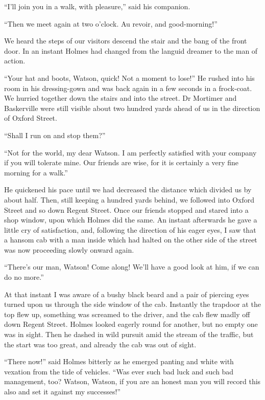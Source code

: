 \documentclass[paper=a5,BCOR=7mm,twoside,DIV=calc,12pt,usegeometry,openany,chapterprefix,endperiod,headings=big]{scrbook} %
\begin{document}
\enquote{I'll join you in a walk, with pleasure,} said his companion.

\enquote{Then we meet again at two o'clock. Au revoir, and good-morning!}

We heard the steps of our visitors descend the stair and the bang of the front door. In an instant Holmes had changed from the languid dreamer to the man of action.

\enquote{Your hat and boots, Watson, quick! Not a moment to lose!} He rushed into his room in his dressing-gown and was back again in a few seconds in a frock-coat. We hurried together down the stairs and into the street. Dr Mortimer and Baskerville were still visible about two hundred yards ahead of us in the direction of Oxford Street.

\enquote{Shall I run on and stop them?}

\enquote{Not for the world, my dear Watson. I am perfectly satisfied with your company if you will tolerate mine. Our friends are wise, for it is certainly a very fine morning for a walk.}

He quickened his pace until we had decreased the distance which divided us by about half. Then, still keeping a hundred yards behind, we followed into Oxford Street and so down Regent Street. Once our friends stopped and stared into a shop window, upon which Holmes did the same. An instant afterwards he gave a little cry of satisfaction, and, following the direction of his eager eyes, I saw that a hansom cab with a man inside which had halted on the other side of the street was now proceeding slowly onward again.

\enquote{There's our man, Watson! Come along! We'll have a good look at him, if we can do no more.}

At that instant I was aware of a bushy black beard and a pair of piercing eyes turned upon us through the side window of the cab. Instantly the trapdoor at the top flew up, something was screamed to the driver, and the cab flew madly off down Regent Street. Holmes looked eagerly round for another, but no empty one was in sight. Then he dashed in wild pursuit amid the stream of the traffic, but the start was too great, and already the cab was out of sight.

\enquote{There now!} said Holmes bitterly as he emerged panting and white with vexation from the tide of vehicles. \enquote{Was ever such bad luck and such bad management, too? Watson, Watson, if you are an honest man you will record this also and set it against my successes!}
\end{document}
